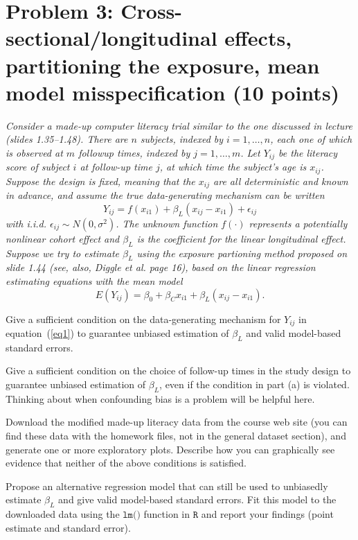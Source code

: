 \documentclass[11pt, letterpaper]{article}
\begin{document}
{\section*{Problem 3: Cross-sectional/longitudinal effects, partitioning the exposure, mean model misspecification (10 points)}
{\em Consider a made-up computer literacy trial similar to the one discussed in lecture (slides 1.35--1.48).  There are $n$ subjects, indexed by $i=1,\ldots,n$, each one of which is observed at
$m$ followup times, indexed by $j=1,\ldots,m$.  Let $Y_{ij}$ be the literacy score of subject $i$ at follow-up time $j$, at which time the subject's age is $x_{ij}$.  Suppose the design is fixed, meaning that the $x_{ij}$ are all
deterministic and known in advance, and assume the true data-generating
mechanism can be written
\begin{equation}
\label{eq1}
Y_{ij}=f(x_{i1})+\beta_L(x_{ij}-x_{i1})+\epsilon_{ij}
\end{equation}
with i.i.d. $\epsilon_{ij}\sim N(0,\sigma^2)$.  The unknown function $f(\cdot)$ 
represents a potentially nonlinear cohort effect and $\beta_L$ is the coefficient for the 
linear longitudinal effect.
Suppose we try to estimate $\beta_L$ using 
the exposure partioning method proposed on slide 1.44
(see, also, Diggle et al. page 16), based on the linear regression estimating equations
with the mean model
\begin{equation}
\label{eq2}
E(Y_{ij})=\beta_0 + \beta_C x_{i1} + \beta_L (x_{ij}-x_{i1}).
\end{equation}}
\begin{enumerate}[(a)]
{\em \item Give a sufficient condition on the data-generating mechanism for $Y_{ij}$ in equation~(\ref{eq1}) to guarantee
unbiased estimation of $\beta_L$ and valid model-based standard errors.}
{\em \item Give a sufficient condition on the choice of follow-up times in the study design to guarantee
unbiased estimation of $\beta_L$, even if the condition in part (a) is violated.  Thinking about
when confounding bias is a problem will be helpful here.}
{\em \item Download the modified made-up literacy data from the course web site (you can find these data with the homework files, not in the general dataset section), and generate
one or more exploratory plots.  Describe how you can graphically see evidence that neither of
the above conditions is satisfied.}
{\em \item Propose an alternative regression model that can still be used to unbiasedly estimate $\beta_L$ and give valid model-based standard errors.  Fit this model to the downloaded data using the $\texttt{lm()}$ function in $\texttt{R}$ and report your findings (point estimate and standard error).
}
\end{enumerate}}
\end{document}
